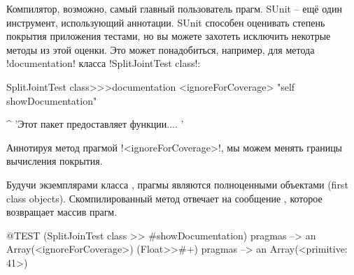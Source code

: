 \documentclass[a4paper,10pt,twoside]{book}
\begin{document}
Компилятор, возможно, самый главный пользователь прагм. SUnit -- ещё один инструмент, использующий аннотации. SUnit способен оценивать степень покрытия приложения тестами, но вы можете захотеть исключить некотрые методы из этой оценки. Это может понадобиться, например, для метода \ct!documentation! класса \ct!SplitJointTest class!:

\begin{code}{}
SplitJointTest class>>>documentation
	<ignoreForCoverage>
	"self showDocumentation"
	
	^ 'Этот пакет предоставляет функции.... '
\end{code}

Аннотируя метод прагмой \ct!<ignoreForCoverage>!, мы можем менять границы вычисления покрытия.


%	


Будучи экземплярами класса , прагмы являются полноценными объектами (first class objects). Скомпилированный метод отвечает на сообщение , которое возвращает массив прагм.

\begin{code}{@TEST}
(SplitJoinTest class >> #showDocumentation) pragmas
  --> an Array(<ignoreForCoverage>)
(Float>>#+) pragmas --> an Array(<primitive: 41>)
\end{code}
\end{document}
